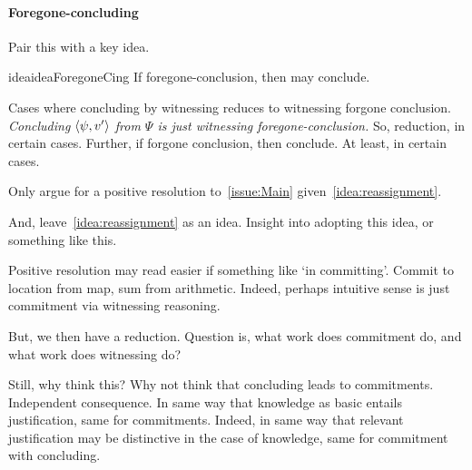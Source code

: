 \paragraph{Foregone-concluding}

\begin{note}
  Pair this with a key idea.

  \begin{restatable}{idea}{ideaForegoneCing}
    \label{idea:reassignment}
    If foregone-conclusion, then may conclude.
  \end{restatable}

  Cases where concluding by witnessing reduces to witnessing forgone conclusion.
  \emph{Concluding \(\langle \psi, v' \rangle\) from \(\Psi\) is just witnessing foregone-conclusion.}
  So, reduction, in certain cases.
  Further, if forgone conclusion, then conclude.
  At least, in certain cases.
\end{note}



\begin{note}[???]
  Only argue for a positive resolution to~\autoref{issue:Main} given~\autoref{idea:reassignment}.

  And, leave~\autoref{idea:reassignment} as an idea.
  Insight into adopting this idea, or something like this.
\end{note}

\begin{note}
  Positive resolution may read easier if something like `in committing'.
  Commit to location from map, sum from arithmetic.
  Indeed, perhaps intuitive sense is just commitment via witnessing reasoning.

  But, we then have a reduction.
  Question is, what work does commitment do, and what work does witnessing do?

  Still, why think this?
  Why not think that concluding leads to commitments.
  Independent consequence.
  In same way that knowledge as basic entails justification, same for commitments.
  Indeed, in same way that relevant justification may be distinctive in the case of knowledge, same for commitment with concluding.
\end{note}

